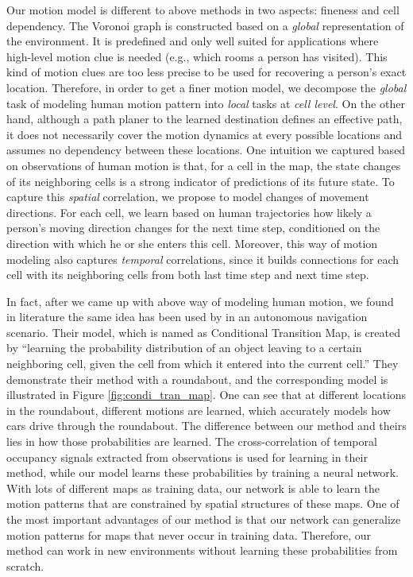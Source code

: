 Our motion model is different to above methods in two aspects: fineness and cell dependency. The Voronoi graph is constructed based on a \textit{global} representation of the environment. It is predefined and only well suited for applications where high-level motion clue is needed (e.g., which rooms a person has visited). This kind of motion clues are too less precise to be used for recovering a person's exact location. Therefore, in order to get a finer motion model, we decompose the \textit{global} task of modeling human motion pattern into \textit{local} tasks at \textit{cell level}. On the other hand, although a path planer to the learned destination defines an effective path, it does not necessarily cover the motion dynamics at every possible locations and assumes no dependency between these locations. One intuition we captured based on observations of human motion is that, for a cell in the map, the state changes of its neighboring cells is a strong indicator of predictions of its future state. To capture this \textit{spatial} correlation, we propose to model changes of movement directions. For each cell, we learn based on human trajectories how likely a person's moving direction changes for the next time step, conditioned on the direction with which he or she enters this cell. Moreover, this way of motion modeling also captures \textit{temporal} correlations, since it builds connections for each cell with its neighboring cells from both last time step and next time step. 

In fact, after we came up with above way of modeling human motion, we found in literature the same idea has been used by \citet{kucner2013conditional} in an autonomous navigation scenario. Their model, which is named as Conditional Transition Map, is created by ``learning the probability distribution of an object leaving to a certain neighboring cell, given the cell from which it entered into the current cell.'' They demonstrate their method with a roundabout, and the corresponding model is illustrated in Figure \ref{fig:condi_tran_map}. One can see that at different locations in the roundabout, different motions are learned, which accurately models how cars drive through the roundabout. The difference between our method and theirs lies in how those probabilities are learned. The cross-correlation of temporal occupancy signals extracted from observations is used for learning in their method, while our model learns these probabilities by training a neural network. With lots of different maps as training data, our network is able to learn the motion patterns that are constrained by spatial structures of these maps. One of the most important advantages of our method is that our network can generalize motion patterns for maps that never occur in training data. Therefore, our method can work in new environments without learning these probabilities from scratch. 

